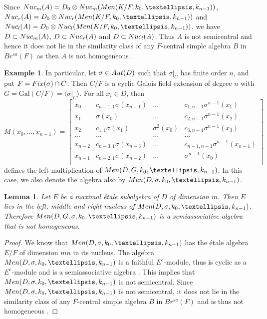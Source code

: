 \documentclass[11pt]{amsart}
\theoremstyle{plain}
\newtheorem{lemma}[theorem]{Lemma}
\theoremstyle{definition}
\newtheorem{example}[theorem]{Example}
\begin{document}
Since ${\rm Nuc}_m(A)=D_0\otimes {\rm Nuc}_m({\rm Men}(K/F, k_0,\dots,k_{n-1}))$, ${\rm Nuc}_r(A)=D_0\otimes {\rm Nuc}_r({\rm Men}(K/F, k_0,\dots,k_{n-1}))$ and ${\rm Nuc}_l(A)=D_0\otimes {\rm Nuc}_l({\rm Men}(K/F, k_0,\dots,k_{n-1}))$, we have
$D\subset {\rm Nuc}_m(A)$, $D\subset {\rm Nuc}_r(A)$ and $D\subset {\rm Nuc}_l(A)$.
 Thus $A$ is not semicentral and hence it does not lie in the similarity class of any $F$-central simple algebra $B$ in $Br^{sa}(F)$ as then $A$ is not homogeneous \cite{BHMRV}.


\begin{example}
In particular, let $\sigma\in {\rm Aut}(D)$ such that
$\sigma|_{C}$ has finite order $n$, and put $F={\rm Fix}(\sigma)\cap C$. Then
  $C/F$ is a cyclic Galois field extension of degree $n$ with $G=\mathrm{Gal}(C/F) = \langle \sigma|_{C} \rangle$.
For  all $x_i\in D$, then
\[ M(x_0,\dots,x_{n-1})=\left [\begin {array}{cccccc}
x_0 &  c_{{n-1},1}\sigma(x_{n-1}) & ... & c_{1,{n-1}} \sigma^{n-1}(x_{1})\\
x_1 & \sigma(x_0) & ... &  c_{2,{n-1}} \sigma^{n-1}(x_{2})\\
x_2 & c_{1,1}\sigma(x_{1}) & \sigma^2(x_0) & c_{3,{n-1}} \sigma^{n-1}(x_{3})\\
...& ...  & ... & ...\\
x_{n-2} &  c_{n-3,1}\sigma(x_{n-3})  & ...& c_{{n-1},{n-1}} \sigma^{n-1}(x_{n-1})\\
x_{n-1} &  c_{n-2,1}\sigma(x_{n-2})  & ...& \sigma^{n-1}(x_{0})\\
\end {array}\right ]
 \]
  defines the left multiplication of ${\rm Men}(D, G, k_0,\dots,k_{n-1})$.
In this case, we also denote the algebra also by ${\rm Men}(D, \sigma, k_0,\dots,k_{n-1})$.
\end{example}

\begin{lemma}
Let $E$ be a maximal \'etale subalgebra of $D$ of dimension $m$.  Then
  $E$ lies in the  left, middle and right nucleus of ${\rm Men}(D, \sigma, k_0,\dots,k_{n-1})$. Therefore ${\rm Men}(D, G, \sigma, k_0,\dots,k_{n-1})$ is a semiassociative algebra that is not homogeneous.
\end{lemma}
\begin{proof}
  We know that
  ${\rm Men}(D, \sigma, k_0,\dots,k_{n-1})$ has the \'etale algebra $E/F$ of dimension $mn$ in its nucleus. The algebra  ${\rm Men}(D, \sigma, k_0,\dots,k_{n-1})$ is a faithful $E^e$-module, thus is cyclic
  as a $E^e$-module \cite[Remark 3.3]{BHMRV} and is a semiassociative algebra \cite{BHMRV}.
  This implies that  ${\rm Men}(D, \sigma, k_0,\dots,k_{n-1})$ is not semicentral.
Since ${\rm Men}(D, \sigma, k_0,\dots,k_{n-1})$  is not semicentral, it does not lie in the similarity class of any $F$-central simple algebra $B$ in $Br^{sa}(F)$ and is thus not homogeneous \cite{BHMRV}.
\end{proof}
\end{document}
